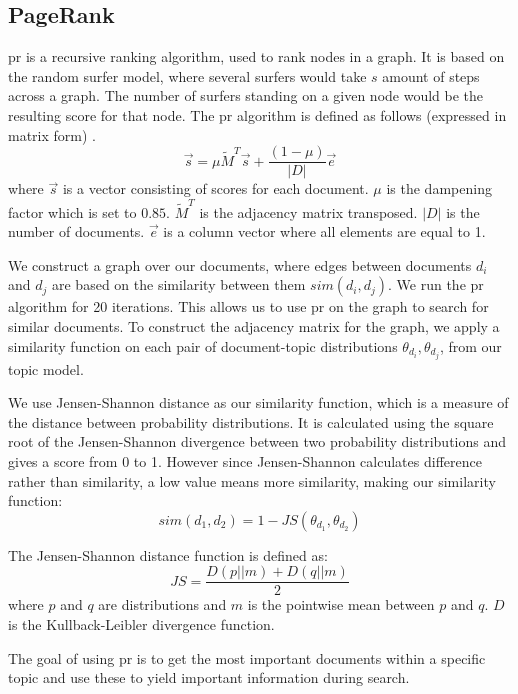\subsection{PageRank}\label{sec:pagerank}
\gls{pr} is a recursive ranking algorithm, used to rank nodes in a graph.
It is based on the random surfer model, where several surfers would take $s$ amount of steps across a graph.
The number of surfers standing on a given node would be the resulting score for that node.
The \gls{pr} algorithm is defined as follows (expressed in matrix form) \cite{ClusterPageRank}.
\begin{equation}
	\overrightarrow{s} = \mu \widetilde{M}^T \overrightarrow{s} + \frac{(1-\mu)}{|D|} \overrightarrow{e}
\end{equation}
where $\overrightarrow{s}$ is a vector consisting of scores for each document. 
$\mu$ is the dampening factor which is set to $0.85$.
$\widetilde{M}^T$ is the adjacency matrix transposed.
$|D|$ is the number of documents.
$\overrightarrow{e}$ is a column vector where all elements are equal to 1.

We construct a graph over our documents, where edges between documents $d_i$ and $d_j$ are based on the similarity between them $sim(d_i, d_j)$.
We run the \gls{pr} algorithm for 20 iterations.
This allows us to use \gls{pr} on the graph to search for similar documents.
To construct the adjacency matrix for the graph, we apply a similarity function on each pair of document-topic distributions $\theta_{d_i}, \theta_{d_j}$, from our topic model.

We use Jensen-Shannon distance as our similarity function, which is a measure of the distance between probability distributions\cite{jensen-shannon2003}\cite{jensen-shannondis2003}.
It is calculated using the square root of the Jensen-Shannon divergence between two probability distributions and gives a score from 0 to 1.
However since Jensen-Shannon calculates difference rather than similarity, a low value means more similarity, making our similarity function:
\begin{equation}
	sim(d_1, d_2) = 1 - JS(\theta_{d_1}, \theta_{d_2})
\end{equation}

The Jensen-Shannon distance function is defined as:
\begin{equation}
	JS = \frac{D(p || m) + D(q || m)}{2}
\end{equation}
where $p$ and $q$ are distributions and $m$ is the pointwise mean between $p$ and $q$. 
$D$ is the Kullback-Leibler divergence function.

The goal of using \gls{pr} is to get the most important documents within a specific topic and use these to yield important information during search.  
